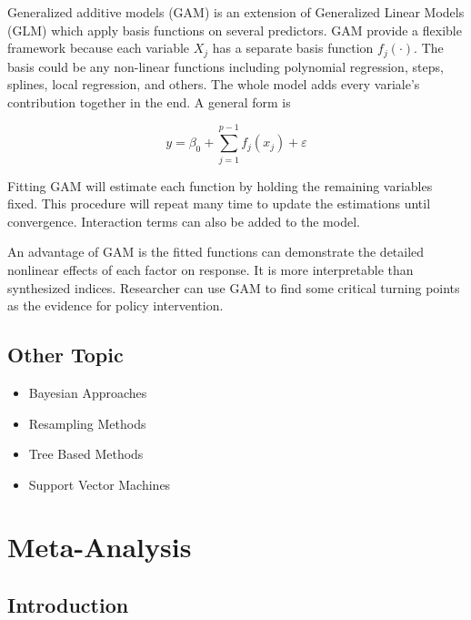\documentclass[
  11pt,
  openany]{memoir}
\begin{document}
Generalized additive models (GAM) is an extension of Generalized Linear Models (GLM) which apply basis functions on several predictors.
GAM provide a flexible framework because each variable \(X_j\) has a separate basis function \(f_j(\cdot)\). The basis could be any non-linear functions including polynomial regression, steps, splines, local regression, and others. The whole model adds every variale's contribution together in the end.
A general form is

\begin{equation}
y=\beta_{0}+\sum_{j=1}^{p-1}f_j(x_j)+\varepsilon
\label{eq:stepf}
\end{equation}

Fitting GAM will estimate each function by holding the remaining variables fixed. This procedure will repeat many time to update the estimations until convergence.
Interaction terms can also be added to the model.

An advantage of GAM is the fitted functions can demonstrate the detailed nonlinear effects of each factor on response. It is more interpretable than synthesized indices. Researcher can use GAM to find some critical turning points as the evidence for policy intervention.

\hypertarget{other-topic}{%
\section{Other Topic}\label{other-topic}}

\begin{itemize}
\item
  Bayesian Approaches
\item
  Resampling Methods
\item
  Tree Based Methods
\item
  Support Vector Machines
\end{itemize}

\hypertarget{meta-analysis}{%
\chapter{Meta-Analysis}\label{meta-analysis}}

\hypertarget{introduction}{%
\section{Introduction}\label{introduction}}
\end{document}
